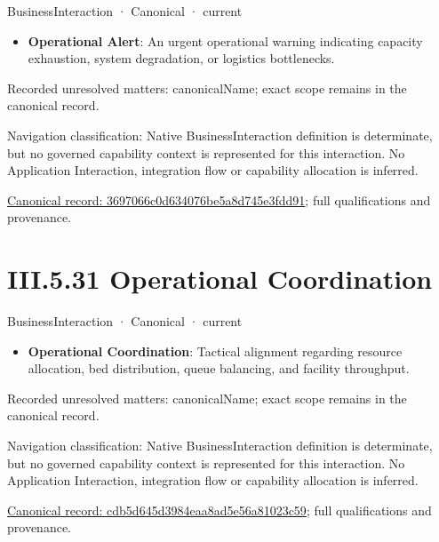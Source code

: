 \label{element:3697066c0d634076be5a8d745e3fdd91}
{\small BusinessInteraction · Canonical · current}\par

\begin{itemize}


\item \textbf{Operational Alert}: An urgent operational warning indicating capacity exhaustion, system degradation, or logistics bottlenecks.

\end{itemize}

{\small Recorded unresolved matters: canonicalName; exact scope remains in the canonical record.}\par
{\small Navigation classification: Native BusinessInteraction definition is determinate, but no governed capability context is represented for this interaction. No Application Interaction, integration flow or capability allocation is inferred.}\par
{\footnotesize \href{../../../../../../../../continuum/business/business-interaction/3697066c0d634076be5a8d745e3fdd91.md}{Canonical record: 3697066c0d634076be5a8d745e3fdd91}; full qualifications and provenance.}\par
\section*{III.5.31 Operational Coordination}
\label{navigation:III.5.31}

\label{element:cdb5d645d3984eaa8ad5e56a81023c59}
{\small BusinessInteraction · Canonical · current}\par

\begin{itemize}


\item \textbf{Operational Coordination}: Tactical alignment regarding resource allocation, bed distribution, queue balancing, and facility throughput.

\end{itemize}

{\small Recorded unresolved matters: canonicalName; exact scope remains in the canonical record.}\par
{\small Navigation classification: Native BusinessInteraction definition is determinate, but no governed capability context is represented for this interaction. No Application Interaction, integration flow or capability allocation is inferred.}\par
{\footnotesize \href{../../../../../../../../continuum/business/business-interaction/cdb5d645d3984eaa8ad5e56a81023c59.md}{Canonical record: cdb5d645d3984eaa8ad5e56a81023c59}; full qualifications and provenance.}\par
